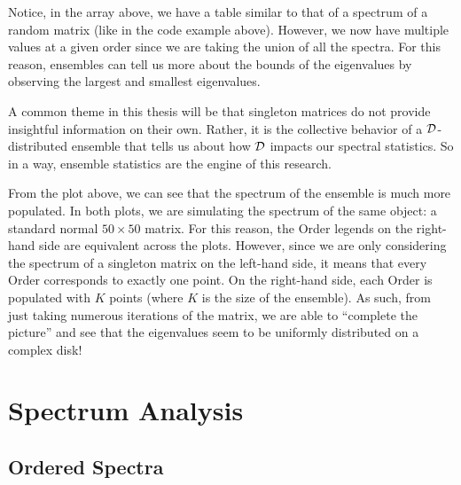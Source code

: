 Notice, in the array above, we have a table similar to that of a spectrum of a random matrix (like in the code example above).
However, we now have multiple values at a given order since we are taking the union of all the spectra.
For this reason, ensembles can tell us more about the bounds of the eigenvalues by observing the largest and smallest eigenvalues.

\newpage

A common theme in this thesis will be that singleton matrices do not provide insightful information on their own.
Rather, it is the collective behavior of a $\mathcal{D}$-distributed ensemble that tells us about how $\mathcal{D}$ impacts our spectral statistics.
So in a way, ensemble statistics are the engine of this research.


From the plot above, we can see that the spectrum of the ensemble is much more populated.
In both plots, we are simulating the spectrum of the same object: a standard normal $50 \times 50$ matrix.
For this reason, the Order legends on the right-hand side are equivalent across the plots.
However, since we are only considering the spectrum of a singleton matrix on the left-hand side, it means that every Order corresponds to exactly one point.
On the right-hand side, each Order is populated with $K$ points (where $K$ is the size of the ensemble).
As such, from just taking numerous iterations of the matrix, we are able to ``complete the picture'' and see that the eigenvalues seem to be uniformly distributed on a complex disk!

\section{Spectrum Analysis}


\subsection{Ordered Spectra}

